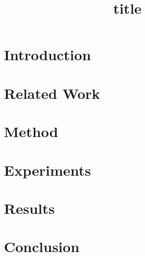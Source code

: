 \documentclass{article}
\title{{{title}}}
\author{}
\date{}
\begin{document}
\maketitle

\begin{abstract}
\end{abstract}

\section{Introduction}

\section{Related Work}

\section{Method}

\section{Experiments}

\section{Results}

\section{Conclusion}


\end{document}
